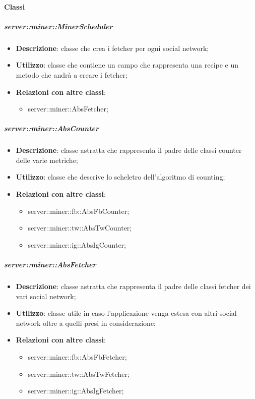 \paragraph{Classi} %
		\subparagraph{server::miner::MinerScheduler} %
		\label{subp:server_miner_MinerScheduler}
			\begin{itemize}
				\item \textbf{Descrizione}: classe che crea i fetcher per ogni social network;
				\item \textbf{Utilizzo}: classe che contiene un campo che rappresenta una recipe e un metodo che andrà a creare i fetcher;
				\item \textbf{Relazioni con altre classi}:
					\begin{itemize}
						\item server::miner::AbsFetcher;
					\end{itemize}
			\end{itemize}
		
		\subparagraph{server::miner::AbsCounter} %
		\label{subp:server_miner_AbsCounter}
			\begin{itemize}
				\item \textbf{Descrizione}: classe astratta che rappresenta il padre delle classi counter delle varie metriche;
				\item \textbf{Utilizzo}: classe che descrive lo scheletro dell'algoritmo di counting;
				\item \textbf{Relazioni con altre classi}:
					\begin{itemize}
						\item server::miner::fb::AbsFbCounter;
						\item server::miner::tw::AbsTwCounter;
						\item server::miner::ig::AbsIgCounter;
					\end{itemize}
			\end{itemize}
		
		\subparagraph{server::miner::AbsFetcher} %
		\label{subp:server_miner_AbsFetcher}
				\begin{itemize}
				\item \textbf{Descrizione}: classe astratta che rappresenta il padre delle classi fetcher dei vari social network;
				\item \textbf{Utilizzo}: classe utile in caso l'applicazione venga estesa con altri social network oltre a quelli presi in considerazione;
				\item \textbf{Relazioni con altre classi}:
					\begin{itemize}
						\item server::miner::fb::AbsFbFetcher;
						\item server::miner::tw::AbsTwFetcher;
						\item server::miner::ig::AbsIgFetcher;
					\end{itemize}
			\end{itemize}
		
